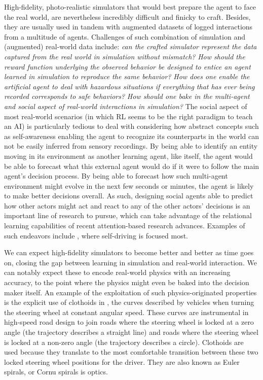High-fidelity, photo-realistic simulators that would best prepare the agent to face the real world,
are nevertheless incredibly difficult and finicky to craft.
Besides, they are usually used in tandem with augmented datasets of logged interactions from
a multitude of agents.
Challenges of such combination of simulation and (augmented) real-world data include:
\emph{can the crafted simulator represent the data captured from the real world in simulation
without mismatch?}
\emph{How should the reward function underlying the observed behavior be designed
to entice an agent learned in simulation to reproduce the same behavior?}
\emph{How does one enable the artificial agent to deal with hazardous situations if
everything that has ever being recorded corresponds to safe behaviors?}
\emph{How should one bake in the multi-agent and social aspect of real-world interactions in simulation?}
The social aspect of most real-world scenarios (in which RL seems to be the right paradigm to teach an AI)
is particularly tedious to deal with considering how abstract concepts such as self-awareness enabling the agent
to recognize its counterparts in the world can not be easily inferred from sensory recordings.
By being able to identify an entity moving in its environment as another learning agent, like itself,
the agent would be able to forecast what this external agent would do if it were to follow the main agent's
decision process. By being able to forecast how such multi-agent environment might evolve
in the next few seconds or minutes, the agent is likely to make better decisions overall.
As such, designing social agents able to predict how other actors might act and react to
any of the other actors' decisions is an important line of research to pursue,
which can take advantage of the relational learning capabilities of recent attention-based research advances.
Examples of such endeavors include
\cite{Bradley_Knox2013-jg,Alahi2016-vi,Leibo2017-lg,Tai2017-wq,Vemula2017-zd,
Li2018-wc,Gupta2018-cu,Kosaraju2019-ui,Zhou2020-hs,Ndousse2020-oz},
where self-driving is focused most.

We can expect high-fidelity simulators to become better and better as time goes on,
closing the gap between learning in simulation and real-world interaction.
We can notably expect these to encode real-world physics with an increasing accuracy,
to the point where the physics might even be baked into the decision maker itself.
An example of the exploitation of such physics-originated properties is the explicit use
of clothoids in \cite{Zeng2020-co}, the curves described by vehicles when turning the steering wheel at
constant angular speed.
These curves are instrumental in high-speed road design to join roads where the steering wheel is locked
at a zero angle (the trajectory describes a straight line) and roads where the steering wheel is locked at a
non-zero angle (the trajectory describes a circle).
Clothoids are used because they translate to the most comfortable transition between these two
locked steering wheel positions for the driver.
They are also known as Euler spirals, or Cornu spirals is optics.


